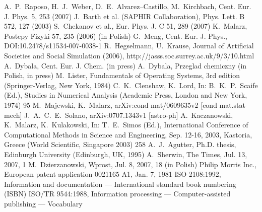 \begin{thebibliography}{99}
\bibitem{}
 A.~P.~Raposo, H.~J.~Weber, D.~E.~Alvarez--Castillo, M.~Kirchbach, Cent. Eur. J. Phys. 5, 253 (2007)
 J.~Barth et al. (SAPHIR Collaboration), Phys. Lett. B 572, 127 (2003)
 S.~Chekanov et al., Eur. Phys. J. C 51, 289 (2007)
 K.~Malarz, Postepy Fizyki 57, 235 (2006) (in Polish)
 G.~Meng, Cent. Eur. J. Phys., DOI:10.2478/s11534-007-0038-1
 R.~Hegselmann, U.~Krause, Journal of Artificial Societies and Social Simulation (2006), http://jasss.soc.surrey.ac.uk/9/3/10.html
 A.~Dybala, Cent. Eur. J. Chem. (in press)
 A.~Dybala, Przeglad chemiczny (in Polish, in press)
 M.~Lister, Fundamentals of Operating Systems, 3rd edition (Springer-Verlag, New York, 1984)
 C.~K.~Clenshaw, K.~Lord, In: B.~K.~P.~Scaife (Ed.), Studies in Numerical Analysis (Academic Press, London and New York, 1974) 95
 M.~Majewski, K.~Malarz, arXiv:cond-mat/0609635v2 [cond-mat.stat-mech]
 J.~A.~C.~E.~Solano, arXiv:0707.1343v1 [astro-ph]
 A.~Kaczanowski, K.~Malarz, K.~Kulakowski, In: T.~E.~Simos (Ed.), International Conference of Computational Methods in Science and Engineering, Sep. 12-16, 2003, Kastoria, Greece (World Scientific, Singapore 2003) 258
 A.~J.~Agutter, Ph.D. thesis, Edinburgh University (Edinburgh, UK, 1995)
 A.~Sherwin, The Times, Jul. 13, 2007, 1
 M.~Dzierzanowski, Wprost, Jul. 8, 2007, 18 (in Polish)
 Philip Morris Inc., European patent application 0021165 A1, Jan. 7, 1981
 ISO 2108:1992, Information and documentation --- International standard book numbering (ISBN)
 ISO/TR 9544:1988, Information processing --- Computer-assisted publishing --- Vocabulary
\end{thebibliography}
